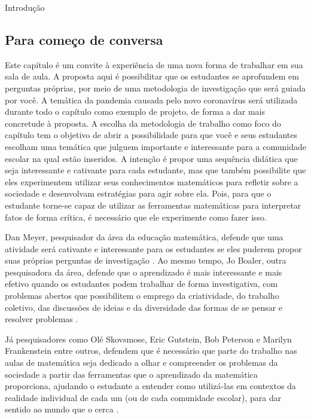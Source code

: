 \mainmatter

\begin{apresentacao}{Introdução}
\subsection{Para começo de conversa}

Este capítulo é um convite à experiência de uma nova forma de trabalhar em sua sala de aula. A proposta aqui é possibilitar que os estudantes se aprofundem em perguntas próprias, por meio de uma metodologia de investigação que será guiada por você. A temática da pandemia causada pelo novo coronavírus será utilizada durante todo o capítulo como exemplo de projeto, de forma a dar mais concretude à proposta. A escolha da metodologia de trabalho como foco do capítulo tem o objetivo de abrir a possibilidade para que você e seus estudantes escolham uma temática que julguem importante e interessante para a comunidade escolar na qual estão inseridos. A intenção é propor uma sequência didática que seja interessante e cativante para cada estudante, mas que também possibilite que eles experimentem utilizar seus conhecimentos matemáticos para refletir sobre a sociedade e desenvolvam estratégias para agir sobre ela. Pois, para que o estudante torne-se capaz de utilizar as ferramentas matemáticas para interpretar fatos de forma crítica, é necessário que ele experimente como fazer isso. 

Dan Meyer, pesquisador da área da educação matemática, defende que uma atividade será cativante e interessante para os estudantes se eles puderem propor suas próprias perguntas de investigação \citep{meyer2011}. Ao mesmo tempo, Jo Boaler, outra pesquisadora da área, defende que o aprendizado é mais interessante e mais efetivo quando os estudantes podem trabalhar de forma investigativa, com problemas abertos que possibilitem o emprego da criatividade, do trabalho coletivo, das discussões de ideias e da diversidade das formas de se pensar e resolver problemas \citep{boaler2018}.

Já pesquisadores como Olé Skovsmose, Eric Gutstein, Bob Peterson e Marilyn Frankenstein entre outros, defendem que é necessário que parte do trabalho nas aulas de matemática seja dedicado a olhar e compreender os problemas da sociedade a partir das ferramentas que o aprendizado da matemática proporciona, ajudando o estudante a entender como utilizá-las em contextos da realidade individual de cada um (ou de cada comunidade escolar), para dar sentido ao mundo que o cerca \citep{skovsmose2014,gutstein2013,frankenstein2014}.


\end{apresentacao}
